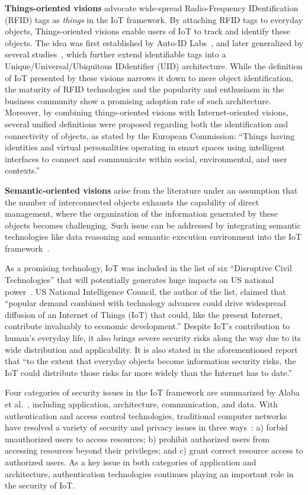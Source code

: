 \textbf{Things-oriented visions} advocate wide-spread Radio-Frequency IDentification (RFID) tags as \textit{things} in the IoT framework. By attaching RFID tags to everyday objects, Things-oriented visions enable users of IoT to track and identify these objects. The idea was first established by Auto-ID Labs~\cite{Auto-ID_Labs_2017-06-26}, and later generalized by several studies~\cite{epcglobal2004radio}\cite{DBLP:conf/icse/2006}, which further extend identifiable tags into a Unique/Universal/Ubiquitous IDdentifier (UID) architecture. While the definition of IoT presented by these visions narrows it down to mere object identification, the maturity of RFID technologies and the popularity and enthusiasm in the business community show a promising adoption rate of such architecture. Moreover, by combining things-oriented visions with Internet-oriented visions, several unified definitions were proposed regarding both the identification and connectivity of objects, as stated by the European Commission\cite{bassi2008internet}:
``Things having identities and virtual personalities operating
in smart spaces using intelligent interfaces to connect
and communicate within social, environmental, and user
contexts.''

\textbf{Semantic-oriented visions} arise from the literature under an assumption that the number of interconnected objects exhausts the capability of direct management, where the organization of the information generated by these objects becomes challenging. Such issue can be addressed by integrating semantic technologies like data reasoning and semantic execution environment into the IoT framework~\cite{toma2009joint}.

As a promising technology, IoT was included in the list of six ``Disruptive Civil Technologies'' that will potentially generates huge impacts on US national power~\cite{council2008six}. US National Intelligence Council, the author of the list, claimed that
``popular demand combined with technology advances could drive widespread diffusion of an Internet of Things (IoT) that could, like the present Internet, contribute invaluably to economic development.''
Despite IoT's contribution to human's everyday life, it also brings severe security risks along the way due to its wide distribution and applicability. It is also stated in the aforementioned report that
``to the extent that everyday objects become information security risks, the IoT could distribute those risks far more widely than the Internet has to date.''

Four categories of security issues in the IoT framework are summarized by Alaba et al.~\cite{DBLP:journals/jnca/AlabaOHA17}, including application, architecture, communication, and data. With authentication and access control technologies, traditional computer networks have resolved a variety of security and privacy issues in three ways~\cite{DBLP:conf/icdcsw/LiuXC12}: a) forbid unauthorized users to access resources; b) prohibit authorized users from accessing resources beyond their privileges; and c) grant correct resource access to authorized users. As a key issue in both categories of application and architecture, authentication technologies continues playing an important role in the security of IoT.

